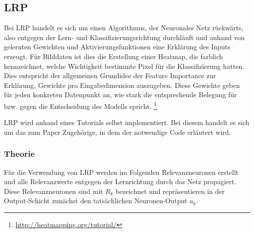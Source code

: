 \subsection{LRP}
\label{subsection: LRP}
Bei LRP handelt es sich um einen Algorithmus, der Neuronales Netz rückwärts, also entgegen der Lern- und Klassifizierungsrichtung durchläuft und anhand von gelernten Gewichten und Aktivierungsfunktionen eine Erklärung des Inputs erzeugt. Für Bilddaten ist dies die Erstellung einer Heatmap, die farblich kennzeichnet, welche Wichtigkeit bestimmte Pixel für die Klassifizierung hatten. Dies entspricht der allgemeinen Grundidee der Feature Importance zur Erklärung, Gewichte pro Eingabedimension auszugeben. Diese Gewichte geben für jeden konkreten Datenpunkt an, wie stark die entsprechende Belegung für bzw. gegen die Entscheidung des Modells spricht. \cite{MontavonLRP} \footnote{\url{http://heatmapping.org/tutorial/}}

LRP wird anhand eines Tutorials selbst implementiert. Bei diesem handelt es sich um das zum Paper \cite{MontavonLRP} Zugehörige, in dem der notwendige Code erläutert wird.

\subsubsection{Theorie}
\label{subsubsection: LRP Theorie}


Für die Verwendung von LRP werden im Folgenden Relevanzneuronen erstellt und alle Relevanzwerte entgegen der Lernrichtung durch das Netz propagiert. Diese Relevanzneuronen sind mit $R_k$ bezeichnet und repräsentieren in der Output-Schicht zunächst den tatsächlichen Neuronen-Output $a_k$. \cite{MONTAVON20181}

